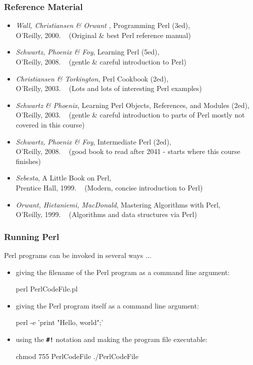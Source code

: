 \begin{frame}[shrink]
\frametitle{Reference Material}

\begin{itemize}
\item  {\em{Wall, Christiansen \& Orwant }},
	Programming Perl (3ed),
	\\{\small O'Reilly, 2000.
		~ (Original \& best Perl reference manual)}
\item  {\em{Schwartz, Phoenix \& Foy}},
	Learning Perl (5ed),
	\\{\small O'Reilly, 2008.
		~ (gentle \&  careful introduction to Perl)}
\item  {\em{Christiansen \& Torkington}},
	Perl Cookbook (2ed),
	\\{\small O'Reilly, 2003.
		~ (Lots and lots of interesting Perl examples)}
\item  {\em{Schwartz \& Phoenix}},
	Learning Perl Objects, References, and Modules (2ed),
	\\{\small O'Reilly, 2003.
		~ (gentle \&  careful introduction to parts of Perl mostly  not covered in this course)}
\item  {\em{Schwartz, Phoenix \& Foy}},
	Intermediate Perl  (2ed),
	\\{\small O'Reilly, 2008.
		~ (good book to read after 2041 - starts where this course finishes)}
\item  {\em{Sebesta}},
	A Little Book on Perl,
	\\{\small Prentice Hall, 1999.
		~ (Modern, concise introduction to Perl)}
\item  {\em{Orwant, Hietaniemi, MacDonald}},
	Mastering Algorithms with Perl,
	\\{\small O'Reilly, 1999.
		~ (Algorithms and data structures via Perl)}
\end{itemize}
\end{frame}

\begin{frame}[fragile]
\frametitle{Running Perl}

Perl programs can be invoked in several ways ...

\begin{itemize}
\item  giving the filename of the Perl program as a command line argument:

\begin{sh}
    perl PerlCodeFile.pl
\end{sh}

\item  giving the Perl program itself as a command line argument:

\begin{sh}
    perl -e 'print "Hello, world\n";'
\end{sh}

\item  using the \textbf{\tt{\#!}} notation and making the program file executable:

\begin{sh}
    chmod 755 PerlCodeFile
    ./PerlCodeFile
\end{sh}

\end{itemize}
\end{frame}

